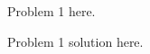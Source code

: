 \documentclass{common/cs157}
\begin{document}
\homeworkhandin 

\begin{problem}{1}
Problem 1 here.
\begin{solution}
Problem 1 solution here.
\end{solution}
\end{problem}
\end{document}

